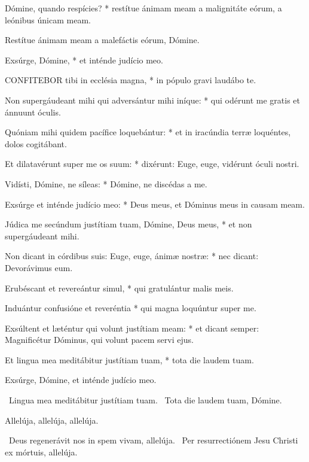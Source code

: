 Dómine, quando respícies? * restítue ánimam meam a malignitáte eórum, a leónibus únicam meam.

 Restítue ánimam meam a malefáctis eórum, Dómine.

 Exsúrge, Dómine, * et inténde judício meo.


\lettrine[lines=2]{C}{ONFITEBOR} tibi in ecclésia magna, * in pópulo gravi laudábo te.

Non supergáudeant mihi qui adversántur mihi iníque: * qui odérunt me gratis et ánnuunt óculis.

Quóniam mihi quidem pacífice loquebántur: * et in iracúndia terræ loquéntes, dolos cogitábant.

Et dilatavérunt super me os suum: * dixérunt: Euge, euge, vidérunt óculi nostri.

Vidísti, Dómine, ne síleas: * Dómine, ne discédas a me.

Exsúrge et inténde judício meo: * Deus meus, et Dóminus meus in causam meam.

Júdica me secúndum justítiam tuam, Dómine, Deus meus, * et non supergáudeant mihi.

Non dicant in córdibus suis: Euge, euge, ánimæ nostræ: * nec dicant: Devorávimus eum.

Erubéscant et revereántur simul, * qui gratulántur malis meis.

Induántur confusióne et reveréntia * qui magna loquúntur super me.

Exsúltent et læténtur qui volunt justítiam meam: * et dicant semper: Magnificétur Dóminus, qui volunt pacem servi ejus.

Et lingua mea meditábitur justítiam tuam, * tota die laudem tuam.

 Exsúrge, Dómine, et inténde judício meo.



\V\ Lingua mea meditábitur justítiam tuam. \R\ Tota die laudem tuam, Dómine.



 Allelúja, allelúja, allelúja.

\V\ Deus regenerávit nos in spem vivam, allelúja. \R\ Per resurrectiónem Jesu Christi ex mórtuis, allelúja.

